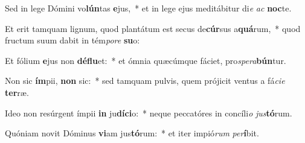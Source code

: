 \item Sed in lege Dómini vo\textbf{lún}tas \textbf{e}jus,~* et in lege ejus meditábitur di\textit{e} \textit{ac} \textbf{noc}te.
\item Et erit tamquam lignum, quod plantátum est secus de\textbf{cúr}sus a\textbf{quá}rum,~* quod fructum suum dabit in tém\textit{po}\textit{re} \textbf{su}o:
\item Et fólium \textbf{e}jus non \textbf{dé}\textbf{flu}et:~* et ómnia quæcúmque fáciet, pro\textit{spe}\textit{ra}\textbf{bún}tur.
\item Non sic \textbf{ím}pii, \textbf{non} sic:~* sed tamquam pulvis, quem prójicit ventus a fá\textit{ci}\textit{e} \textbf{ter}ræ.
\item Ideo non resúrgent ímpii \textbf{in} ju\textbf{dí}\textbf{ci}o:~* neque peccatóres in concíli\textit{o} \textit{jus}\textbf{tó}rum.
\item Quóniam novit Dóminus \textbf{vi}am jus\textbf{tó}rum:~* et iter impió\textit{rum} \textit{per}\textbf{í}bit.
